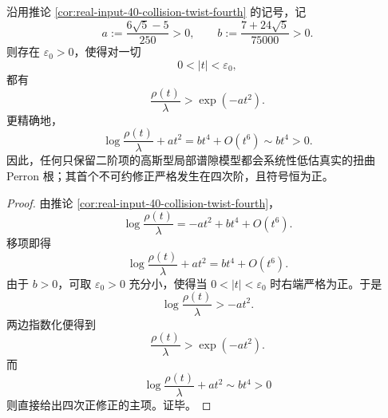 \begin{theorem}[单位根扭曲的局部谱隙严格高于高斯二阶模型]\label{thm:xi-time-part9oe-twist-gap-strictly-above-gaussian}
沿用推论 \ref{cor:real-input-40-collision-twist-fourth} 的记号，记
\[
a:=\frac{6\sqrt5-5}{250}>0,
\qquad
b:=\frac{7+24\sqrt5}{75000}>0.
\]
则存在 \(\varepsilon_0>0\)，使得对一切
\[
0<|t|<\varepsilon_0,
\]
都有
\[
\frac{\rho(t)}{\lambda}>\exp(-a t^2).
\]
更精确地，
\[
\log\frac{\rho(t)}{\lambda}+a t^2
=
b t^4+O(t^6)
\sim b t^4>0.
\]
因此，任何只保留二阶项的高斯型局部谱隙模型都会系统性低估真实的扭曲 Perron 根；其首个不可约修正严格发生在四次阶，且符号恒为正。
\end{theorem}
\begin{proof}
由推论 \ref{cor:real-input-40-collision-twist-fourth}，
\[
\log\frac{\rho(t)}{\lambda}
=
-a t^2+b t^4+O(t^6).
\]
移项即得
\[
\log\frac{\rho(t)}{\lambda}+a t^2=b t^4+O(t^6).
\]
由于 \(b>0\)，可取 \(\varepsilon_0>0\) 充分小，使得当 \(0<|t|<\varepsilon_0\) 时右端严格为正。于是
\[
\log\frac{\rho(t)}{\lambda}>-a t^2.
\]
两边指数化便得到
\[
\frac{\rho(t)}{\lambda}>\exp(-a t^2).
\]
而
\[
\log\frac{\rho(t)}{\lambda}+a t^2\sim b t^4>0
\]
则直接给出四次正修正的主项。证毕。
\end{proof}

\endinput
